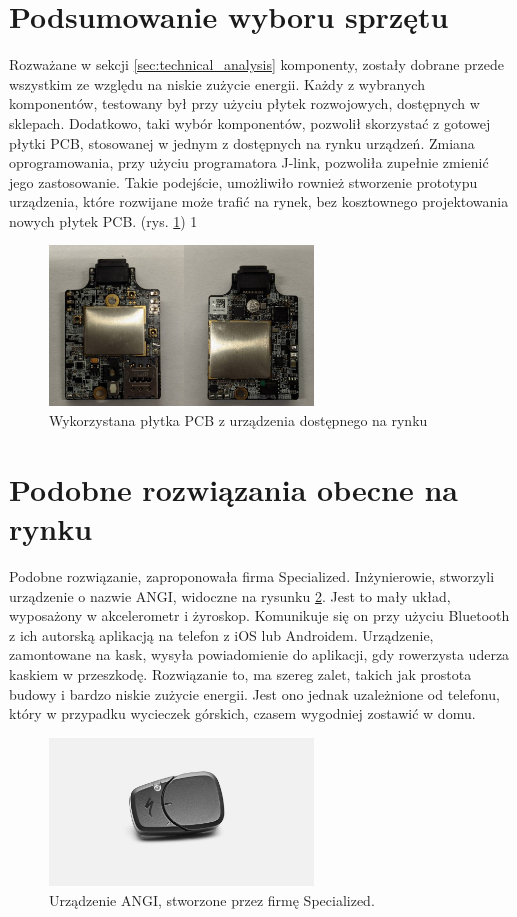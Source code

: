 \section{Podsumowanie wyboru sprzętu}
Rozważane w sekcji \ref{sec:technical_analysis} komponenty, zostały dobrane przede wszystkim ze względu na niskie zużycie energii. Każdy z wybranych komponentów, testowany był przy użyciu płytek rozwojowych, dostępnych w sklepach. Dodatkowo, taki wybór komponentów, pozwolił skorzystać z gotowej płytki PCB, stosowanej w jednym z dostępnych na rynku urządzeń. Zmiana oprogramowania, przy użyciu programatora J-link, pozwoliła zupełnie zmienić jego zastosowanie. Takie podejście, umożliwiło rownież stworzenie prototypu urządzenia, które rozwijane może trafić na rynek, bez kosztownego projektowania nowych płytek PCB. (rys. \ref{img:pcb})
1
\begin{figure}[t]
    \centering
    \includegraphics[width=7cm]{Graphics/PCB.png}
    \caption{Wykorzystana płytka PCB z urządzenia dostępnego na rynku}
    \label{img:pcb}
\end{figure}
\section{Podobne rozwiązania obecne na rynku}
Podobne rozwiązanie, zaproponowała firma Specialized. Inżynierowie, stworzyli urządzenie o nazwie ANGI, widoczne na rysunku \ref{img:angi_img}. Jest to mały układ, wyposażony w akcelerometr i żyroskop. Komunikuje się on przy użyciu Bluetooth z ich autorską aplikacją na telefon z iOS lub Androidem. Urządzenie, zamontowane na kask, wysyła powiadomienie do aplikacji, gdy rowerzysta uderza kaskiem w przeszkodę. Rozwiązanie to, ma szereg zalet, takich jak prostota budowy i bardzo niskie zużycie energii. Jest ono jednak uzależnione od telefonu, który w przypadku wycieczek górskich, czasem wygodniej zostawić w domu.
\begin{figure}[h]
\includegraphics[width=7cm]{Graphics/angi.png}
\centering
\caption{Urządzenie ANGI, stworzone przez firmę Specialized.\cite{ANGI}}
\centering
\label{img:angi_img}
\end{figure}















